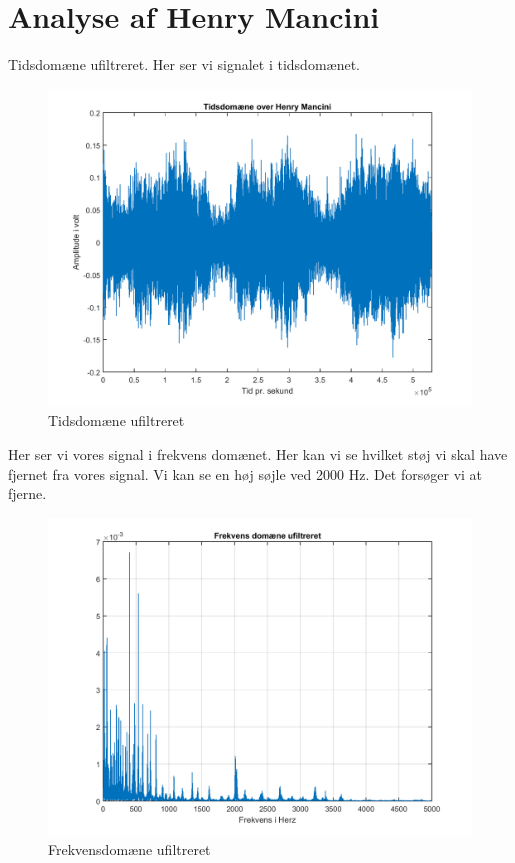 \documentclass[12pt, letterpaper]{article}
\begin{document}
\section{Analyse af Henry Mancini}
Tidsdomæne ufiltreret. Her ser vi signalet i tidsdomænet. 
\begin{figure}[H]
           \includegraphics[width=\linewidth]{billeder/VinylUfiltreret}	   							\caption{Tidsdomæne ufiltreret}
\end{figure}

Her ser vi vores signal i frekvens domænet. Her kan vi se hvilket støj vi skal have fjernet fra vores signal. Vi kan se en høj søjle ved 2000 Hz. Det forsøger vi at fjerne. 
\begin{figure}[H]
           \includegraphics[width=\linewidth]{billeder/Vinylfrekvensd}	   							\caption{Frekvensdomæne ufiltreret}
\end{figure}
\end{document}
